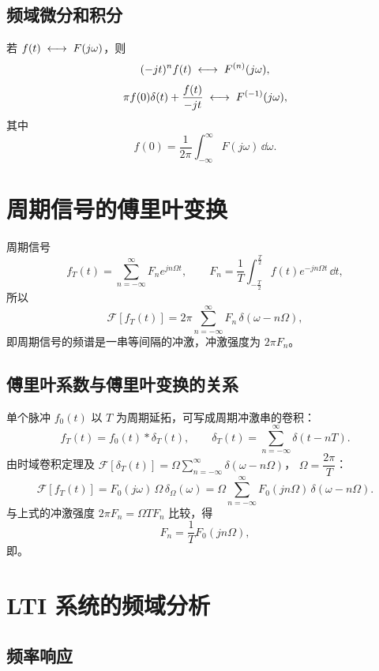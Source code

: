 \subsection{频域微分和积分}

若 $f(t)\;\longleftrightarrow\; F(j\omega)$，则
\[
    (-jt)^{n}f(t)\;\longleftrightarrow\; F^{(n)}(j\omega),
\]
\[
    \pi f(0)\delta(t)+\frac{f(t)}{-jt}\;\longleftrightarrow\; F^{(-1)}(j\omega),
\]
其中
\[
    f(0)=\frac{1}{2\pi}\int_{-\infty}^{\infty}F(j\omega)\,\dd\omega .
\]

\section{周期信号的傅里叶变换}

周期信号
\[
    f_T(t)=\sum_{n=-\infty}^{\infty}F_ne^{jn\Omega t},
    \qquad
    F_n=\frac{1}{T}\int_{-\frac{T}{2}}^{\frac{T}{2}}f(t)e^{-jn\Omega t}\,\dd t,
\]
所以
\[
    \mathcal{F}[f_T(t)]=2\pi\sum_{n=-\infty}^{\infty}F_n\,\delta(\omega-n\Omega),
\]
即周期信号的频谱是一串等间隔的冲激，冲激强度为 $2\pi F_n$。

\subsection{傅里叶系数与傅里叶变换的关系}

单个脉冲 $f_0(t)$ 以 $T$ 为周期延拓，可写成周期冲激串的卷积：
\[
    f_T(t)=f_0(t)*\delta_T(t),
    \qquad
    \delta_T(t)=\sum_{n=-\infty}^{\infty}\delta(t-nT).
\]
由时域卷积定理及 $\mathcal{F}[\delta_T(t)]=\Omega\displaystyle\sum_{n=-\infty}^{\infty}\delta(\omega-n\Omega)$，
$\Omega=\dfrac{2\pi}{T}$：
\[
    \mathcal{F}[f_T(t)]
    =F_0(j\omega)\,\Omega\,\delta_{\Omega}(\omega)
    =\Omega\sum_{n=-\infty}^{\infty}F_0(jn\Omega)\,\delta(\omega-n\Omega).
\]
与上式的冲激强度 $2\pi F_n=\Omega T F_n$ 比较，得
\[
    F_n=\frac{1}{T}F_0(jn\Omega),
\]
即。

\section{LTI 系统的频域分析}

\subsection{频率响应}

